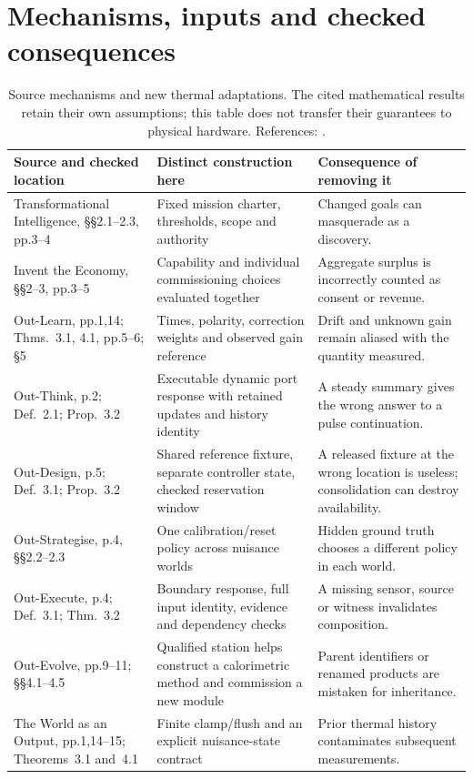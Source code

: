 \documentclass[11pt,letterpaper]{article}
\begin{document}
\section{Mechanisms, inputs and checked consequences}
\label{app:mechanisms}
\begin{table}[H]
\centering\small
\begin{tabularx}{\linewidth}{@{}>{\raggedright\arraybackslash}p{.24\linewidth}>{\raggedright\arraybackslash}p{.27\linewidth}X@{}}
\toprule
Source and checked location & Distinct construction here & Consequence of removing it\\\midrule
Transformational Intelligence, \S\S2.1--2.3, pp.3--4 & Fixed mission charter, thresholds, scope and authority & Changed goals can masquerade as a discovery.\\
Invent the Economy, \S\S2--3, pp.3--5 & Capability and individual commissioning choices evaluated together & Aggregate surplus is incorrectly counted as consent or revenue.\\
Out-Learn, pp.1,14; Thms.~3.1, 4.1, pp.5--6; \S5 & Times, polarity, correction weights and observed gain reference & Drift and unknown gain remain aliased with the quantity measured.\\
Out-Think, p.2; Def.~2.1; Prop.~3.2 & Executable dynamic port response with retained updates and history identity & A steady summary gives the wrong answer to a pulse continuation.\\
Out-Design, p.5; Def.~3.1; Prop.~3.2 & Shared reference fixture, separate controller state, checked reservation window & A released fixture at the wrong location is useless; consolidation can destroy availability.\\
Out-Strategise, p.4, \S\S2.2--2.3 & One calibration/reset policy across nuisance worlds & Hidden ground truth chooses a different policy in each world.\\
Out-Execute, p.4; Def.~3.1; Thm.~3.2 & Boundary response, full input identity, evidence and dependency checks & A missing sensor, source or witness invalidates composition.\\
Out-Evolve, pp.9--11; \S\S4.1--4.5 & Qualified station helps construct a calorimetric method and commission a new module & Parent identifiers or renamed products are mistaken for inheritance.\\
The World as an Output, pp.1,14--15; Theorems~3.1 and~4.1 & Finite clamp/flush and an explicit nuisance-state contract & Prior thermal history contaminates subsequent measurements.\\\bottomrule
\end{tabularx}
\caption{Source mechanisms and new thermal adaptations. The cited mathematical results retain their own assumptions; this table does not transfer their guarantees to physical hardware. References: \cite{transformational,economy,outlearn,outthink,outdesign,outstrategise,outexecute,outevolve,world}.}
\label{tab:mechanisms}
\end{table}
\end{document}
